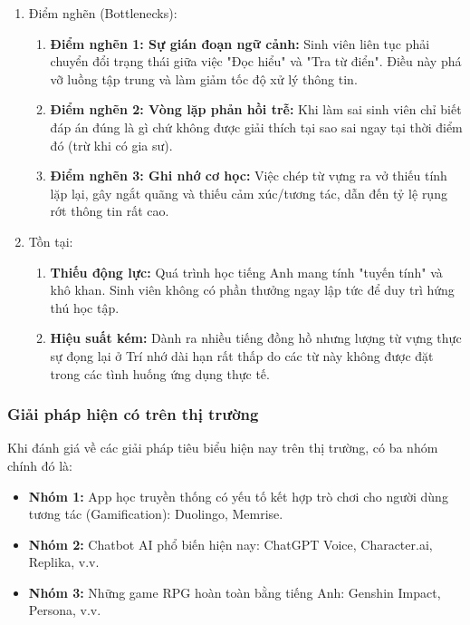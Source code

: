 \begin{enumerate}
\item Điểm nghẽn (Bottlenecks):
\begin{enumerate}[label=\alph*), nosep]
    \item \textbf{Điểm nghẽn 1: Sự gián đoạn ngữ cảnh:} Sinh viên liên tục phải chuyển đổi trạng thái giữa việc "Đọc hiểu" và "Tra từ điển". Điều này phá vỡ luồng tập trung  và làm giảm tốc độ xử lý thông tin.
    \item \textbf{Điểm nghẽn 2: Vòng lặp phản hồi trễ:} Khi làm sai sinh viên chỉ biết đáp án đúng là gì chứ không được giải thích tại sao sai ngay tại thời điểm đó (trừ khi có gia sư).
    \item \textbf{Điểm nghẽn 3: Ghi nhớ cơ học:} Việc chép từ vựng ra vở thiếu tính lặp lại, gây ngắt quãng và thiếu cảm xúc/tương tác, dẫn đến tỷ lệ rụng rớt thông tin rất cao.
\end{enumerate}


\item Tồn tại:
\begin{enumerate}[label = \alph*), nosep]
	\item \textbf{Thiếu động lực:} Quá trình học tiếng Anh mang tính "tuyến tính" và khô khan. Sinh viên không có phần thưởng ngay lập tức để duy trì hứng thú học tập.
	\item \textbf{Hiệu suất kém:} Dành ra nhiều tiếng đồng hồ nhưng lượng từ vựng thực sự đọng lại ở Trí nhớ dài hạn rất thấp do các từ này không được đặt trong các tình huống ứng dụng thực tế.
\end{enumerate}

\end{enumerate}

\subsubsection{Giải pháp hiện có trên thị trường}

Khi đánh giá về các giải pháp tiêu biểu hiện nay trên thị trường, có ba nhóm chính đó là:

\begin{itemize}
    \item \textbf{Nhóm 1:} App học truyền thống có yếu tố kết hợp trò chơi cho người dùng tương tác (Gamification): Duolingo, Memrise.
    \item \textbf{Nhóm 2:} Chatbot AI phổ biến hiện nay: ChatGPT Voice, Character.ai, Replika, v.v.
    \item \textbf{Nhóm 3:} Những game RPG hoàn toàn bằng tiếng Anh: Genshin Impact, Persona, v.v.
\end{itemize}

